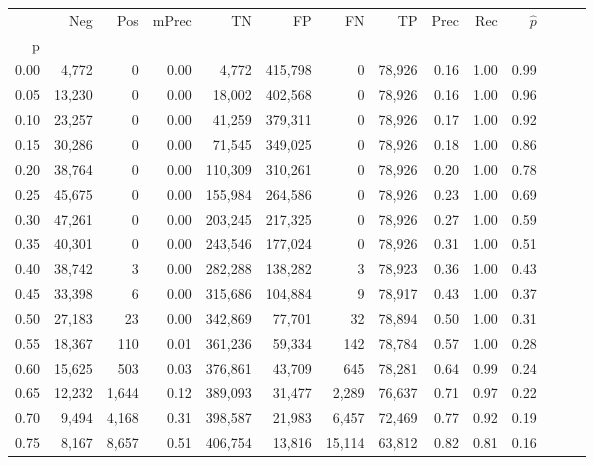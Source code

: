 \begin{tabular}{rrrrrrrrrrrrrr}
\toprule
{} &     Neg &     Pos & mPrec &       TN &       FP &      FN &      TP &  Prec &   Rec & $\hat{p}$ \\
p    &         &         &       &          &          &         &         &       &       &           \\
\midrule
0.00 &   4,772 &       0 &  0.00 &    4,772 &  415,798 &       0 &  78,926 &  0.16 &  1.00 &      0.99 \\
0.05 &  13,230 &       0 &  0.00 &   18,002 &  402,568 &       0 &  78,926 &  0.16 &  1.00 &      0.96 \\
0.10 &  23,257 &       0 &  0.00 &   41,259 &  379,311 &       0 &  78,926 &  0.17 &  1.00 &      0.92 \\
0.15 &  30,286 &       0 &  0.00 &   71,545 &  349,025 &       0 &  78,926 &  0.18 &  1.00 &      0.86 \\
0.20 &  38,764 &       0 &  0.00 &  110,309 &  310,261 &       0 &  78,926 &  0.20 &  1.00 &      0.78 \\
0.25 &  45,675 &       0 &  0.00 &  155,984 &  264,586 &       0 &  78,926 &  0.23 &  1.00 &      0.69 \\
0.30 &  47,261 &       0 &  0.00 &  203,245 &  217,325 &       0 &  78,926 &  0.27 &  1.00 &      0.59 \\
0.35 &  40,301 &       0 &  0.00 &  243,546 &  177,024 &       0 &  78,926 &  0.31 &  1.00 &      0.51 \\
0.40 &  38,742 &       3 &  0.00 &  282,288 &  138,282 &       3 &  78,923 &  0.36 &  1.00 &      0.43 \\
0.45 &  33,398 &       6 &  0.00 &  315,686 &  104,884 &       9 &  78,917 &  0.43 &  1.00 &      0.37 \\
0.50 &  27,183 &      23 &  0.00 &  342,869 &   77,701 &      32 &  78,894 &  0.50 &  1.00 &      0.31 \\
0.55 &  18,367 &     110 &  0.01 &  361,236 &   59,334 &     142 &  78,784 &  0.57 &  1.00 &      0.28 \\
0.60 &  15,625 &     503 &  0.03 &  376,861 &   43,709 &     645 &  78,281 &  0.64 &  0.99 &      0.24 \\
0.65 &  12,232 &   1,644 &  0.12 &  389,093 &   31,477 &   2,289 &  76,637 &  0.71 &  0.97 &      0.22 \\
0.70 &   9,494 &   4,168 &  0.31 &  398,587 &   21,983 &   6,457 &  72,469 &  0.77 &  0.92 &      0.19 \\
0.75 &   8,167 &   8,657 &  0.51 &  406,754 &   13,816 &  15,114 &  63,812 &  0.82 &  0.81 &      0.16 \\

\end{tabular}
